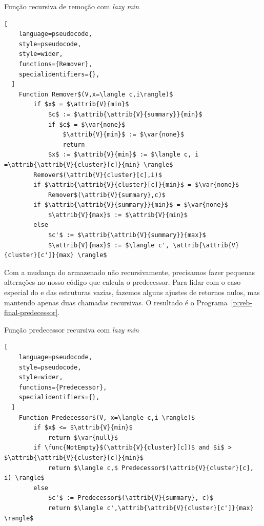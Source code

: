 \begin{programruledcaption}{Função recursiva de remoção com \emph{lazy min} \label{p:veb-final-remove}}
  \begin{lstlisting}[
    language=pseudocode,
    style=pseudocode,
    style=wider,
    functions={Remover},
    specialidentifiers={},
  ]
    Function Remover$(V,x=\langle c,i\rangle)$
        if $x$ = $\attrib{V}{min}$
            $c$ := $\attrib{\attrib{V}{summary}}{min}$
            if $c$ = $\var{none}$ 
                $\attrib{V}{min}$ := $\var{none}$
                return
            $x$ := $\attrib{V}{min}$ := $\langle c, i =\attrib{\attrib{V}{cluster}[c]}{min} \rangle$
        Remover$(\attrib{V}{cluster}[c],i)$
        if $\attrib{\attrib{V}{cluster}[c]}{min}$ = $\var{none}$
            Remover$(\attrib{V}{summary},c)$
        if $\attrib{\attrib{V}{summary}}{min}$ = $\var{none}$
            $\attrib{V}{max}$ := $\attrib{V}{min}$
        else 
            $c'$ := $\attrib{\attrib{V}{summary}}{max}$
            $\attrib{V}{max}$ := $\langle c', \attrib{\attrib{V}{cluster}[c']}{max} \rangle$
  \end{lstlisting}
\end{programruledcaption}

Com a mudança do  armazenado não recursivamente, precisamos fazer
pequenas alterações no nosso código que calcula o predecessor. Para lidar com o
caso especial do  e das estruturas vazias, fazemos alguns ajustes de
retornos nulos, mas mantendo apenas duas chamadas recursivas. O resultado é o
Programa~\ref{p:veb-final-predecessor}.

\begin{programruledcaption}{Função predecessor recursiva com \emph{lazy min} \label{p:veb-final-predecessor}}
  \begin{lstlisting}[
    language=pseudocode,
    style=pseudocode,
    style=wider,
    functions={Predecessor},
    specialidentifiers={},
  ]
    Function Predecessor$(V, x=\langle c,i \rangle)$
        if $x$ <= $\attrib{V}{min}$
            return $\var{null}$
        if \func{NotEmpty}$(\attrib{V}{cluster}[c])$ and $i$ > $\attrib{\attrib{V}{cluster}[c]}{min}$
            return $\langle c,$ Predecessor$(\attrib{V}{cluster}[c], i) \rangle$
        else
            $c'$ := Predecessor$(\attrib{V}{summary}, c)$
            return $\langle c',\attrib{\attrib{V}{cluster}[c']}{max} \rangle$
  \end{lstlisting}
\end{programruledcaption}

